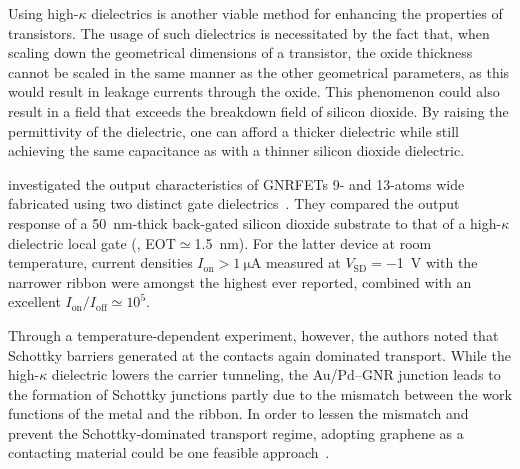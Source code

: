 Using high-$\kappa$ dielectrics is another viable method for enhancing the properties of transistors. The usage of such dielectrics is necessitated by the fact that, when scaling down the geometrical dimensions of a transistor, the oxide thickness cannot be scaled in the same manner as the other geometrical parameters, as this would result in leakage currents through the oxide. This phenomenon could also result in a field that exceeds the breakdown field of silicon dioxide. By raising the permittivity of the dielectric, one can afford a thicker dielectric while still achieving the same capacitance as with a thinner silicon dioxide dielectric.

 investigated the output characteristics of \glspl{GNRFET} 9- and 13-atoms wide fabricated using two distinct gate dielectrics~\cite{llinas2017short}. They compared the output response of a \SI{50}{\nano\metre}-thick back-gated silicon dioxide substrate to that of a high-$\kappa$ dielectric local gate (, \gls{EOT}$ \simeq $\SI{1.5}{\nano\metre}). For the latter device at room temperature, current densities $I_\textrm{on}>\SI{1}{\micro\ampere}$ measured at $V_\textrm{SD}=$\SI{-1}{\volt} with the narrower ribbon were amongst the highest ever reported, combined with an excellent $I_\textrm{on}/I_\textrm{off}\simeq 10^5$.

Through a temperature-dependent experiment, however, the authors noted that Schottky barriers generated at the contacts again dominated transport. While the high-$\kappa$ dielectric lowers the carrier tunneling, the Au/Pd--\gls{GNR} junction leads to the formation of Schottky junctions partly due to the mismatch between the work functions of the metal and the ribbon. In order to lessen the mismatch and prevent the Schottky-dominated transport regime, adopting graphene as a contacting material could be one feasible approach~\cite{braun2021optimized, el2020controlled}.




